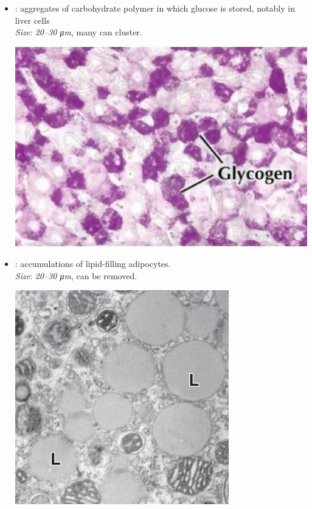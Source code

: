 \begin{multicols}{2}
\begin{itemize}
\begin{center}
  \end{center}
  \item {}: aggregates of carbohydrate polymer in which glucose is stored, notably in liver cells\\
  \textit{Size}: \emph{20--30 \si{\micro m}}, many can cluster.
  \begin{center}
    \hspace{-30pt}\includegraphics[width=0.8\columnwidth]{images/week-1-glycogen.png}
  \end{center}
  \item {}: accumulations of lipid-filling adipocytes. \\
  \textit{Size}: \emph{20--30 \si{\micro m}}, can be removed.
  \begin{center}
    \hspace{-30pt}\includegraphics[width=0.8\columnwidth]{images/week-1-liquid.png}
  \end{center}
  \end{itemize}
\end{multicols}

